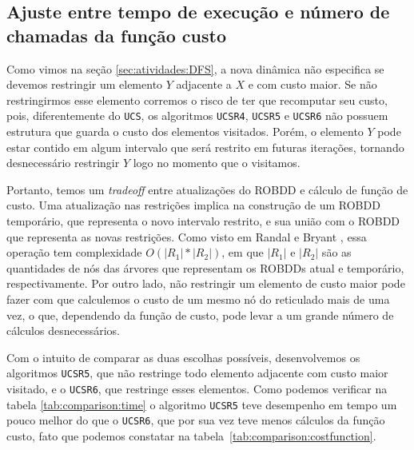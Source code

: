 \documentclass[12pt]{article}
\begin{document}

\subsection{Ajuste entre tempo de execução e número de chamadas da função custo} \label{sec:atividades:ajuste}

Como vimos na seção \ref{sec:atividades:DFS}, a nova dinâmica não especifica se devemos restringir um elemento $Y$ adjacente a $X$ e com custo maior. Se não restringirmos esse elemento corremos o risco de ter que recomputar seu custo, pois, diferentemente do {\tt UCS}, os algoritmos {\tt UCSR4}, {\tt UCSR5} e {\tt UCSR6} não possuem estrutura que guarda o custo dos elementos visitados. Porém, o elemento $Y$ pode estar contido em algum intervalo que será restrito em futuras iterações, tornando desnecessário restringir $Y$ logo no momento que o visitamos.

Portanto, temos um \emph{tradeoff} entre atualizações do ROBDD e cálculo de função de custo. Uma atualização nas restrições implica na construção de um ROBDD temporário, que representa o novo intervalo restrito, e sua união com o ROBDD que representa as novas restrições. Como visto em Randal e  Bryant \cite{bryant}, essa operação tem complexidade $O(|R_1| * |R_2|)$, em que $|R_1|$ e $|R_2|$ são as quantidades de nós das árvores que representam os ROBDDs atual e temporário, respectivamente. Por outro lado, não restringir um elemento de custo maior pode fazer com que calculemos o custo de um mesmo nó do reticulado mais de uma vez, o que, dependendo da função de custo, pode levar a um grande número de cálculos desnecessários.

Com o intuito de comparar as duas escolhas possíveis, desenvolvemos os algoritmos {\tt UCSR5}, que não restringe todo elemento adjacente com custo maior visitado, e o {\tt UCSR6}, que restringe esses elementos. Como podemos verificar na tabela \ref{tab:comparison:time} o algoritmo {\tt UCSR5} teve desempenho em tempo um pouco melhor do que o {\tt UCSR6}, que por sua vez teve menos cálculos da função custo, fato que podemos constatar na tabela~\ref{tab:comparison:costfunction}. 
\end{document}
